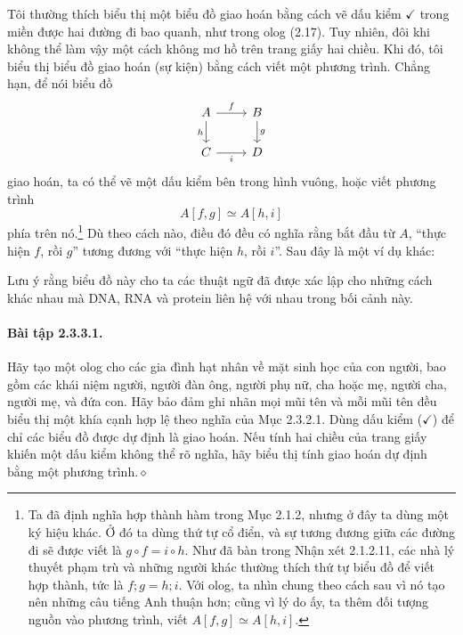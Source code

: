 Tôi thường thích biểu thị một biểu đồ giao hoán bằng cách vẽ dấu kiểm $\checkmark$ trong miền được hai đường đi bao quanh, như trong olog (2.17). Tuy nhiên, đôi khi không thể làm vậy một cách không mơ hồ trên trang giấy hai chiều. Khi đó, tôi biểu thị biểu đồ giao hoán (sự kiện) bằng cách viết một phương trình. Chẳng hạn, để nói biểu đồ
\[\begin{tikzcd}A\arrow[r,"f"]\arrow[d,"h"']&B\arrow[d,"g"]\\C\arrow[r,"i"']&D\end{tikzcd}\]
giao hoán, ta có thể vẽ một dấu kiểm bên trong hình vuông, hoặc viết phương trình
\[A[f,g]\simeq A[h,i]\]
phía trên nó.\footnote{Ta đã định nghĩa hợp thành hàm trong Mục 2.1.2, nhưng ở đây ta dùng một ký hiệu khác. Ở đó ta dùng thứ tự cổ điển, và sự tương đương giữa các đường đi sẽ được viết là $g\circ f=i\circ h$. Như đã bàn trong Nhận xét 2.1.2.11, các nhà lý thuyết phạm trù và những người khác thường thích thứ tự biểu đồ để viết hợp thành, tức là $f;g=h;i$. Với olog, ta nhìn chung theo cách sau vì nó tạo nên những câu tiếng Anh thuận hơn; cũng vì lý do ấy, ta thêm đối tượng nguồn vào phương trình, viết $A[f,g]\simeq A[h,i]$.} Dù theo cách nào, điều đó đều có nghĩa rằng bắt đầu từ $A$, ``thực hiện $f$, rồi $g$'' tương đương với ``thực hiện $h$, rồi $i$''.
Sau đây là một ví dụ khác:
\begin{center}\end{center}
Lưu ý rằng biểu đồ này cho ta các thuật ngữ đã được xác lập cho những cách khác nhau mà DNA, RNA và protein liên hệ với nhau trong bối cảnh này.
\paragraph{Bài tập 2.3.3.1.} Hãy tạo một olog cho các gia đình hạt nhân về mặt sinh học của con người, bao gồm các khái niệm người, người đàn ông, người phụ nữ, cha hoặc mẹ, người cha, người mẹ, và đứa con. Hãy bảo đảm ghi nhãn mọi mũi tên và mỗi mũi tên đều biểu thị một khía cạnh hợp lệ theo nghĩa của Mục 2.3.2.1. Dùng dấu kiểm ($\checkmark$) để chỉ các biểu đồ được dự định là giao hoán. Nếu tính hai chiều của trang giấy khiến một dấu kiểm không thể rõ nghĩa, hãy biểu thị tính giao hoán dự định bằng một phương trình.\hfill$\diamond$

